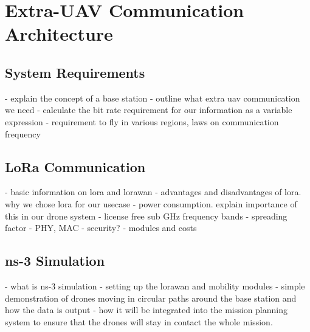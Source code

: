 \newpage
{}
\section{Extra-UAV Communication Architecture} \label{sec:extra_uav_communication}

\subsection{System Requirements}
\label{sec:euc_requirements}

- explain the concept of a base station
- outline what extra uav communication we need
- calculate the bit rate requirement for our information as a variable expression
- requirement to fly in various regions, laws on communication frequency

\subsection{LoRa Communication}
\label{sec:euc_lora}

- basic information on lora and lorawan
- advantages and disadvantages of lora. why we chose lora for our usecase
- power consumption. explain importance of this in our drone system
- license free sub GHz frequency bands
- spreading factor
- PHY, MAC
- security?
- modules and costs

\subsection{ns-3 Simulation}
\label{sec:euc_ns3}

- what is ns-3 simulation
- setting up the lorawan and mobility modules
- simple demonstration of drones moving in circular paths around the base station and how the data is output
- how it will be integrated into the mission planning system to ensure that the drones will stay in contact the whole mission. 